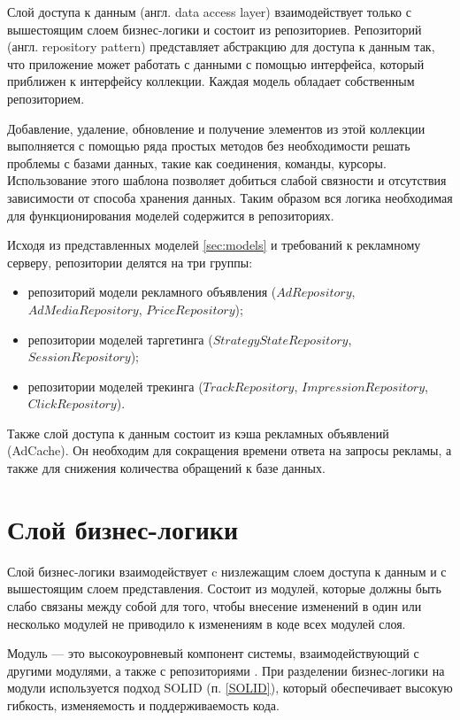 \documentclass[specification,annotation,times]{itmo-student-thesis}
\begin{document}
Слой доступа к данным (англ. data access layer) \cite{data-access-layer} взаимодействует только с вышестоящим слоем бизнес-логики и состоит из репозиториев. Репозиторий (англ. repository pattern) \cite{repository-pattern} представляет абстракцию для доступа к данным так, что приложение может работать с данными с помощью интерфейса, который приближен к интерфейсу коллекции. Каждая модель обладает собственным репозиторием.

Добавление, удаление, обновление и получение элементов из этой коллекции выполняется с помощью ряда простых методов без необходимости решать проблемы с базами данных, такие как соединения, команды, курсоры. Использование этого шаблона позволяет добиться слабой связности и отсутствия зависимости от способа хранения данных. Таким образом вся логика необходимая для функционирования моделей содержится в репозиториях.

Исходя из представленных моделей \ref{sec:models} и требований к рекламному серверу, репозитории делятся на три группы:
\begin{itemize}
\item репозиторий модели рекламного объявления ($AdRepository$, $AdMediaRepository$, $PriceRepository$);
\item репозитории моделей таргетинга ($StrategyStateRepository$, $SessionRepository$);
\item репозитории моделей трекинга ($TrackRepository$, $ImpressionRepository$, $ClickRepository$).
\end{itemize}

Также слой доступа к данным состоит из кэша рекламных объявлений (AdCache). Он необходим для сокращения времени ответа на запросы рекламы, а также для снижения количества обращений к базе данных.

\section{Слой бизнес-логики}\label{sec:business-logic-layer}

Слой бизнес-логики взаимодействует c низлежащим слоем доступа к данным и с вышестоящим слоем представления. Состоит из модулей, которые должны быть слабо связаны между собой для того, чтобы внесение изменений в один или несколько модулей не приводило к изменениям в коде всех модулей слоя.

Модуль — это высокоуровневый компонент системы, взаимодействующий с другими модулями, а также с репозиториями . При разделении бизнес-логики на модули используется подход SOLID (п. \ref{SOLID}), который обеспечивает высокую гибкость, изменяемость и поддерживаемость кода.
\end{document}
